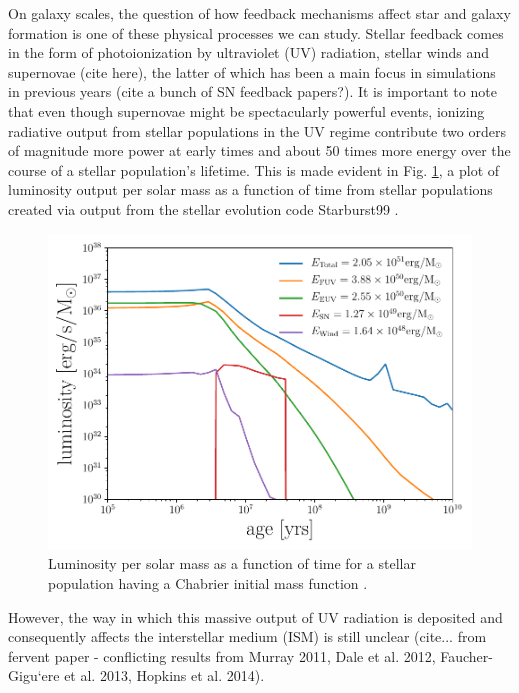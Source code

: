 \documentclass[fleq,usenatbib]{mnras}
\begin{document}
On galaxy scales, the question of how feedback mechanisms affect star and 
galaxy formation is one of these physical processes we can study. Stellar 
feedback comes in the form of photoionization by ultraviolet (UV) radiation, 
stellar winds and supernovae (cite here), the latter of which has been 
a main focus in simulations in previous years (cite a bunch of SN feedback 
papers?). It is important to note that even though supernovae might be 
spectacularly powerful events, ionizing radiative output from stellar 
populations in the UV regime contribute two orders of magnitude more power at 
early times and about 50 times more energy over the course of a stellar 
population's lifetime. This is made evident in Fig. \ref{fig:uvsn}, a 
plot of luminosity output per solar mass as a function of time from stellar 
populations created via output from the stellar evolution code Starburst99 
\citep{leithererEt99}. 
\begin{figure}
\includegraphics[width=1\linewidth]{Figures/uvsn.pdf}
\caption{Luminosity per solar mass as a function of time for a stellar 
population having a Chabrier initial mass function \citep{chabrier03}.}
\label{fig:uvsn}
\end{figure}
However, the way in which this massive output of UV radiation is deposited 
and consequently affects the interstellar medium (ISM) is still unclear 
(cite... from fervent paper - conflicting results from Murray 2011, Dale 
et al. 2012, Faucher-Gigu`ere et al. 2013, Hopkins et al. 2014).
\end{document}
